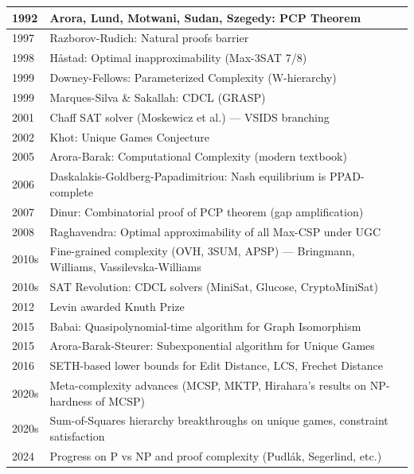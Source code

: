 \begin{tabularx}{\linewidth}{|l|X|}
1992 & Arora, Lund, Motwani, Sudan, Szegedy: PCP Theorem \\ \hline
1997 & Razborov-Rudich: Natural proofs barrier \\ \hline
1998 & Håstad: Optimal inapproximability (Max-3SAT 7/8) \\ \hline
1999 & Downey-Fellows: Parameterized Complexity (W-hierarchy) \\ \hline
1999 & Marques-Silva \& Sakallah: CDCL (GRASP) \\ \hline
2001 & Chaff SAT solver (Moskewicz et al.) — VSIDS branching \\ \hline
2002 & Khot: Unique Games Conjecture \\ \hline
2005 & Arora-Barak: Computational Complexity (modern textbook) \\ \hline
2006 & Daskalakis-Goldberg-Papadimitriou: Nash equilibrium is PPAD-complete \\ \hline
2007 & Dinur: Combinatorial proof of PCP theorem (gap amplification) \\ \hline
2008 & Raghavendra: Optimal approximability of all Max-CSP under UGC \\ \hline
2010s & Fine-grained complexity (OVH, 3SUM, APSP) — Bringmann, Williams, Vassilevska-Williams \\ \hline
2010s & SAT Revolution: CDCL solvers (MiniSat, Glucose, CryptoMiniSat) \\ \hline
2012 & Levin awarded Knuth Prize \\ \hline
2015 & Babai: Quasipolynomial-time algorithm for Graph Isomorphism \\ \hline
2015 & Arora-Barak-Steurer: Subexponential algorithm for Unique Games \\ \hline
2016 & SETH-based lower bounds for Edit Distance, LCS, Frechet Distance \\ \hline
2020s & Meta-complexity advances (MCSP, MKTP, Hirahara's results on NP-hardness of MCSP) \\ \hline
2020s & Sum-of-Squares hierarchy breakthroughs on unique games, constraint satisfaction \\ \hline
2024 & Progress on P vs NP and proof complexity (Pudlák, Segerlind, etc.) \\ \hline
\end{tabularx}


